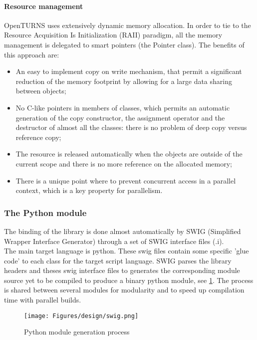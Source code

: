 \paragraph{Resource management}

OpenTURNS uses extensively dynamic memory allocation. In order to tie to the Resource Acquisition Is Initialization (RAII) paradigm, all the memory management is delegated to smart pointers (the Pointer class). The benefits of this approach are:
\begin{itemize}
\item An easy to implement copy on write mechanism, that permit a significant reduction of the memory footprint by allowing for a large data sharing between objects;
\item No C-like pointers in members of classes, which permits an automatic generation of the copy constructor, the assignment operator and the destructor of almost all the classes: there is no problem of deep copy versus reference copy;
\item The resource is released automatically when the objects are outside of the current scope and there is no more reference on the allocated memory;
\item There is a unique point where to prevent concurrent access in a parallel context, which is a key property for parallelism.
\end{itemize}

\subsubsection{The Python module}

The binding of the library is done almost automatically by SWIG (Simplified Wrapper Interface Generator) through a set of SWIG interface files (.i).\\
The main target language is python.
These swig files contain some specific 'glue code' to each class for the target script language.
SWIG parses the library headers and theses swig interface files to generates the corresponding module source yet to be compiled to produce a binary python module, see \ref{fig:swig}.
The process is shared between several modules for modularity and to speed up compilation time with parallel builds.

\begin{figure}[H]
\begin{center}
\texttt{[image: Figures/design/swig.png]}
\caption{Python module generation process}\label{fig:swig}
\end{center}
\end{figure}


